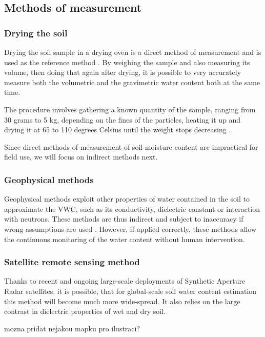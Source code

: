 \subsection{Methods of measurement}
\subsubsection{Drying the soil}
Drying the soil sample in a drying oven is a direct method of measurement and is used as the reference method \cite{webster_humidity_1998}. By weighing the sample and also measuring its volume, then doing that again after drying, it is possible to very accurately measure both the volumetric and the gravimetric water content both at the same time.

The procedure involves gathering a known quantity of the sample, ranging from 30 grams to 5 kg, depending on the fines of the particles, heating it up and drying it at 65 to 110 degrees Celsius until the weight stops decreasing \cite{department_of_sustainable_natural_resources_soil_2024,myjove_corporation_determination_2024, paul_soil_2007}.

Since direct methods of measurement of soil moisture content are impractical for field use, we will focus on indirect methods next.

\subsubsection{Geophysical methods}
Geophysical methods exploit other properties of water contained in the soil to approximate the VWC, such as its conductivity, dielectric constant or interaction with neutrons. These methods are thus indirect and subject to inaccuracy if wrong assumptions are used \cite{webster_humidity_1998}. However, if applied correctly, these methods allow the continuous monitoring of the water content without human intervention.



\subsubsection{Satellite remote sensing method}
Thanks to recent and ongoing large-scale deployments of Synthetic Aperture Radar satellites, it is possible, that for global-scale soil water content estimation this method will become much more wide-spread. It also relies on the large contrast in dielectric properties of wet and dry soil.

mozna pridat nejakou mapku pro ilustraci?


